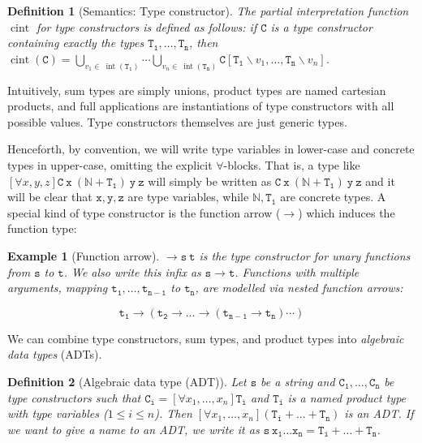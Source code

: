 \documentclass[]{scrartcl}
\theoremstyle{break}
\newtheorem{definition}{Definition}
\newtheorem{example}{Example}
\newcommand{\N}{\mathbb{N}}
\newcommand{\allQ}[1]{\left[\forall #1 \right]}
\DeclareMathOperator{\tint}{int}
\newcommand{\type}[1]{\mathtt{#1}}
\DeclareMathOperator{\cint}{cint}
\newcommand{\lp}{{\rm (}}
\newcommand{\rp}{{\rm )}}
\newcommand{\paren}[1]{\lp{#1}\rp}
\begin{document}
\begin{definition}[Semantics: Type constructor]\label{def:typeConSem}
The partial interpretation function $\cint$ for type constructors is defined as follows: if $\type{C}$ is a type constructor containing exactly the types $\type{T_1},\dots,\type{T_n}$, then $\cint(\type{C}) = \bigcup\limits_{v_1 \in\ \tint(\type{T_1})} \cdots \bigcup\limits_{v_n \in\ \tint(\type{T_n})} \type{C}[\type{T_1}\backslash v_1,\dots,\type{T_n}\backslash v_n]$.
\end{definition}

Intuitively, sum types are simply unions, product types are named cartesian products, and full applications are instantiations of type constructors with all possible values. Type constructors themselves are just generic types.

Henceforth, by convention, we will write type variables in lower-case and concrete types in upper-case, omitting the explicit $\forall$-blocks. That is, a type like $\allQ{x,y,z} \type{C\ x\ (\N + T_1)\ y\ z}$ will simply be written as $\type{C\ x\ (\N + T_1)\ y\ z}$ and it will be clear that $\type{x}, \type{y}, \type{z}$ are type variables, while $\N, \type{T_1}$ are concrete types. A special kind of type constructor is the function arrow ($\rightarrow$) which induces the function type:

\begin{example}[Function arrow]
	$\rightarrow \type{s}\ \type{t}$ is the type constructor for unary functions from $\type{s}$ to $\type{t}$. We also write this infix as $\type{s} \rightarrow \type{t}$. Functions with multiple arguments, mapping $\type{t_1},\dots,\type{t_{n-1}}$ to $\type{t_n}$, are modelled via nested function arrows:
	
	$$
		\type{t_1} \rightarrow (\type{t_2} \rightarrow \dots \rightarrow (\type{t_{n-1}} \rightarrow \type{t_n})\cdots)
	$$
\end{example}

\noindent
We can combine type constructors, sum types, and product types into {\em algebraic data types} (ADTs).

\begin{definition}[Algebraic data type (ADT)]\label{def:ADT}
Let $\type{s}$ be a string and $\type{C_1},\dots,\type{C_n}$ be type constructors such that $\type{C_i} = \allQ{x_1,\dots,x_n} \type{T_i}$ and $\type{T_i}$ is a named product type with type variables \paren{$1 \leq i \leq n$}. Then $\allQ{x_1,\dots,x_n} (\type{T_i} + \dots + \type{T_n})$ is an ADT. If we want to give a name to an ADT, we write it as $\type{s\ x_1 \dots x_n = T_i + \dots + T_n}$.
\end{definition}
\end{document}
